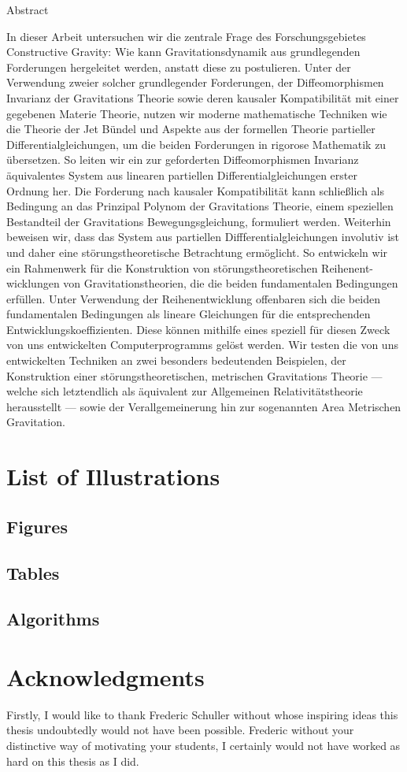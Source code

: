 \documentclass[a4paper,12pt, DIV=14, BCOR=5mm, twoside, headsepline, numbers=noenddot]{scrbook}
\makeatletter
\providecommand\phantomsection{}
\newcommand\listofillustrations{
    \chapter*{List of Illustrations}
    \phantomsection
    \section*{Figures}
    \phantomsection
    \@starttoc{lof}%
    \bigskip
    \section*{Tables}%
    \phantomsection
    \@starttoc{lot}%
    \bigskip
    \section*{Algorithms}%
    \phantomsection
    \@starttoc{loa}
    }
\newenvironment{abstract}{%
  \titlepage%
  \null\vfil%
  \begin{center}\normalfont\usekomafont{disposition}Abstract\end{center}%
}{%
  \par
  \vfil\null%
  \endtitlepage%
}
\makeatother
\begin{document}
\begin{abstract}
In dieser Arbeit untersuchen wir die zentrale Frage des Forschungsgebietes Constructive Gravity: Wie kann Gravitationsdynamik aus grundlegenden Forderungen hergeleitet werden, anstatt diese zu postulieren.
Unter der Verwendung zweier solcher grundlegender Forderungen, der Diffeomorphismen Invarianz der Gravitations Theorie sowie deren kausaler Kompatibilität mit einer gegebenen Materie Theorie, nutzen wir moderne mathematische Techniken wie die Theorie der Jet Bündel und Aspekte aus der formellen Theorie partieller Differentialgleichungen, um die beiden Forderungen in rigorose Mathematik zu übersetzen. So leiten wir ein zur geforderten Diffeomorphismen Invarianz äquivalentes System aus linearen partiellen Differentialgleichungen erster Ordnung her. Die Forderung nach kausaler Kompatibilität kann schließlich als Bedingung an das Prinzipal Polynom der Gravitations Theorie, einem speziellen Bestandteil der Gravitations Bewegungsgleichung, formuliert werden. 
Weiterhin beweisen wir, dass das System aus partiellen Diffferentialgleichungen involutiv ist und daher eine störungstheoretische Betrachtung ermöglicht. So entwickeln wir ein Rahmenwerk für die Konstruktion von störungstheoretischen Reihenent- wicklungen von Gravitationstheorien, die die beiden fundamentalen Bedingungen erfüllen. Unter Verwendung der Reihenentwicklung offenbaren sich die beiden fundamentalen Bedingungen als lineare Gleichungen für die entsprechenden Entwicklungskoeffizienten. Diese können mithilfe eines speziell für diesen Zweck von uns entwickelten Computerprogramms gelöst werden.
Wir testen die von uns entwickelten Techniken an zwei besonders bedeutenden Beispielen, der Konstruktion einer störungstheoretischen, metrischen Gravitations Theorie --- welche sich letztendlich als äquivalent zur Allgemeinen Relativitätstheorie herausstellt ---  sowie der Verallgemeinerung hin zur sogenannten Area Metrischen Gravitation. 
\end{abstract}

\tableofcontents

\listofillustrations

\listoflistings

\chapter*{Acknowledgments}
Firstly, I would like to thank Frederic Schuller without whose inspiring ideas this thesis undoubtedly would not have been possible. Frederic without your distinctive way of motivating your students, I certainly would not have worked as hard on this thesis as I did.
\end{document}
